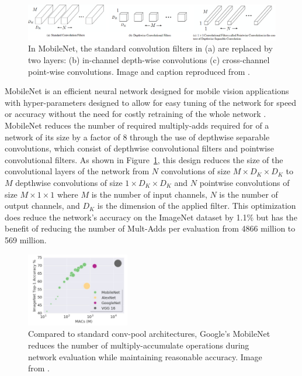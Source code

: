 \documentclass{article}
\begin{document}
\begin{figure}[t]
  \centering
  \includegraphics[width=\textwidth]{mobilenet_depthwise_sep}
  \caption{In MobileNet, the standard convolution filters in (a) are replaced by two layers: (b) in-channel depth-wise convolutions (c) cross-channel point-wise convolutions. Image and caption reproduced from \cite{MobileNet}.}
  \label{fig:depthwise_sep}
\end{figure}

MobileNet is an efficient neural network designed for mobile vision applications with hyper-parameters designed to allow for easy tuning of the network for speed or accuracy without the need for costly retraining of the whole network \cite{MobileNet}. MobileNet reduces the number of required multiply-adds required for of a network of its size by a factor of 8 through the use of depthwise separable convolutions, which consist of depthwise convolutional filters and pointwise convolutional filters. As shown in Figure~\ref{fig:depthwise_sep}, this design reduces the size of the convolutional layers of the network from $N$ convolutions of size $M \times D_K \times D_K$ to $M$ depthwise convolutions of size $1 \times D_K \times D_K$ and $N$ pointwise convolutions of size $M \times 1 \times 1$ where $M$ is the number of input channels, $N$ is the number of output channels, and $D_K$ is the dimension of the applied filter. This optimization does reduce the network's accuracy on the ImageNet dataset by 1.1\% but has the benefit of reducing the number of Mult-Adds per evaluation from 4866 million to 569 million.

\begin{figure}[b]
  \centering
  \includegraphics[width=0.4\textwidth]{mobilenet_fig}
  \caption{Compared to standard conv-pool architectures, Google's MobileNet reduces the number of multiply-accumulate operations during network evaluation while maintaining reasonable accuracy. Image from \cite{mobilenetfig}.}
  \label{fig:mobilenet}
\end{figure}
\end{document}
